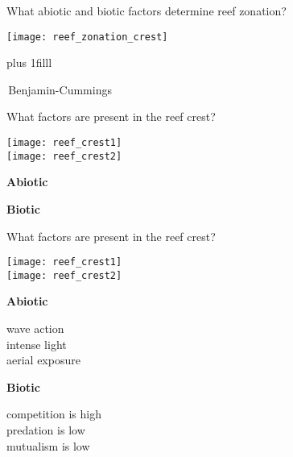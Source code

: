 \documentclass[t]{beamer}
\begin{document}
\begin{frame}[t]{What abiotic and biotic factors determine reef zonation?}

\texttt{[image: reef\_zonation\_crest]}

\vskip0pt plus 1filll

\tiny\textcopyright\,Benjamin-Cummings
\end{frame}

\begin{frame}[t]{What factors are present in the reef crest?}

\begin{multicols}{2}
	\begin{center}
	
	\texttt{[image: reef\_crest1]}\\[1ex]
	
	\texttt{[image: reef\_crest2]}
	\end{center}
\columnbreak

	\hangpara\textbf{Abiotic}
	
	\vspace*{4\baselineskip}
	
	\hangpara\textbf{Biotic}
	
	
\end{multicols}
\end{frame}

\begin{frame}[t]{What factors are present in the reef crest?}

\begin{multicols}{2}
	\begin{center}
	
	\texttt{[image: reef\_crest1]}\\[1ex]
	
	\texttt{[image: reef\_crest2]}
	\end{center}
\columnbreak

	\hangpara\textbf{Abiotic}
	
	\hangpara wave action\\\pause intense light\\\pause aerial exposure
	
	\hangpara\textbf{Biotic}
	
	\hangpara competition is high\\\pause predation is low\\\pause mutualism is low
	
\end{multicols}
\end{frame}
\end{document}

